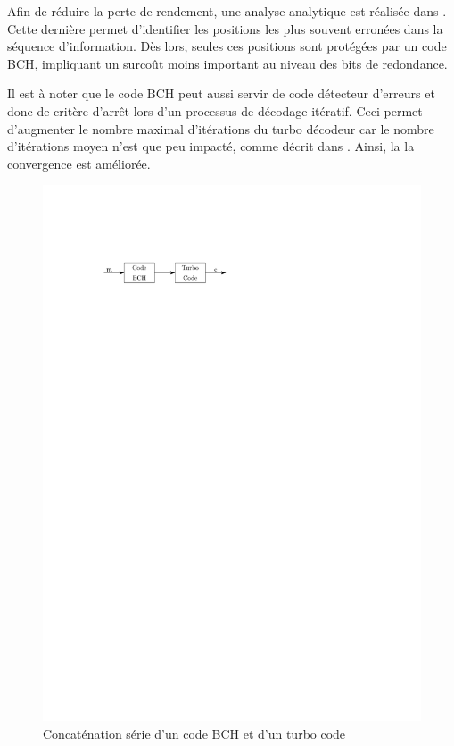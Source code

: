 Afin de réduire la perte de rendement, une analyse analytique est réalisée dans \cite{narayananBCH}. Cette dernière permet d’identifier les positions les plus souvent erronées dans la séquence d'information. Dès lors, seules ces positions sont protégées par un code BCH, impliquant un surcoût moins important au niveau des bits de redondance.

Il est à noter que le code BCH peut aussi servir de code détecteur d'erreurs et donc de critère d’arrêt lors d'un processus de décodage itératif. Ceci permet d'augmenter le nombre maximal d'itérations du turbo décodeur car le nombre d'itérations moyen n'est que peu impacté, comme décrit dans \cite{takeshitaBCH}. Ainsi, la la convergence est améliorée.

\begin{figure}[!tb]
	\begin{center}
	\includegraphics[]{main/ch1_fig/abaiss/bch.pdf}
	\end{center}
	\caption{Concaténation série d'un code BCH et d'un turbo code \label{fig:bchc}}
\end{figure}

